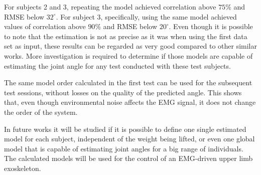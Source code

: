 \documentclass[letterpaper, 10 pt, conference]{ieeeconf}  %
\begin{document}
\begin{changemargin}{10cm}{0cm}
For subjects 2 and 3, repeating the model achieved correlation above $75\%$ and RMSE below $32^\circ$. For subject 3, specifically, using the same model achieved values of correlation above $90\%$ and RMSE below $20^\circ$. Even though it is possible to note that the estimation is not as precise as it was when using the first data set as input, these results can be regarded as very good compared to other similar works. More investigation is required to determine if those models are capable of estimating the joint angle for any test conducted with these test subjects.
% 
% 

% 
% 

The same model order calculated in the first test can be used for the subsequent test sessions, without losses on the quality of the predicted angle. This shows that, even though environmental noise affects the EMG signal, it does not change the order of the system.

In future works it will be studied if it is possible to define one single estimated model for each subject, independent of the weight being lifted, or even one global model that is capable of estimating joint angles for a big range of individuals. The calculated models will be used for the control of an EMG-driven upper limb exoskeleton.





\end{changemargin}















\end{document}
